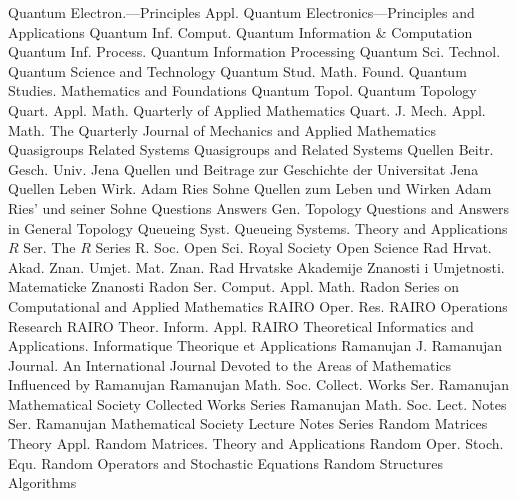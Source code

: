 {Quantum Electron.---Principles Appl.}
{Quantum Electronics---Principles and Applications}
{Quantum Inf. Comput.}
{Quantum Information & Computation}
{Quantum Inf. Process.}
{Quantum Information Processing}
{Quantum Sci. Technol.}
{Quantum Science and Technology}
{Quantum Stud. Math. Found.}
{Quantum Studies. Mathematics and Foundations}
{Quantum Topol.}
{Quantum Topology}
{Quart. Appl. Math.}
{Quarterly of Applied Mathematics}
{Quart. J. Mech. Appl. Math.}
{The Quarterly Journal of Mechanics and Applied Mathematics}
{Quasigroups Related Systems}
{Quasigroups and Related Systems}
{Quellen Beitr. Gesch. Univ. Jena}
{Quellen und Beitrage zur Geschichte der Universitat Jena}
{Quellen Leben Wirk. Adam Ries Sohne}
{Quellen zum Leben und Wirken Adam Ries' und seiner Sohne}
{Questions Answers Gen. Topology}
{Questions and Answers in General Topology}
{Queueing Syst.}
{Queueing Systems. Theory and Applications}
{$R$ Ser.}
{The $R$ Series}
{R. Soc. Open Sci.}
{Royal Society Open Science}
{Rad Hrvat. Akad. Znan. Umjet. Mat. Znan.}
{Rad Hrvatske Akademije Znanosti i Umjetnosti. Matematicke Znanosti}
{Radon Ser. Comput. Appl. Math.}
{Radon Series on Computational and Applied Mathematics}
{RAIRO Oper. Res.}
{RAIRO Operations Research}
{RAIRO Theor. Inform. Appl.}
{RAIRO Theoretical Informatics and Applications. Informatique Theorique et Applications}
{Ramanujan J.}
{Ramanujan Journal. An International Journal Devoted to the Areas of Mathematics Influenced by Ramanujan}
{Ramanujan Math. Soc. Collect. Works Ser.}
{Ramanujan Mathematical Society Collected Works Series}
{Ramanujan Math. Soc. Lect. Notes Ser.}
{Ramanujan Mathematical Society Lecture Notes Series}
{Random Matrices Theory Appl.}
{Random Matrices. Theory and Applications}
{Random Oper. Stoch. Equ.}
{Random Operators and Stochastic Equations}
{Random Structures Algorithms}
